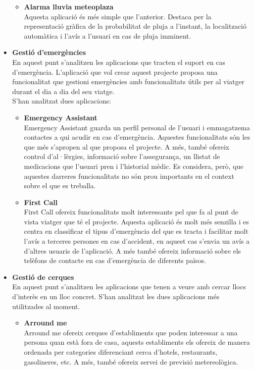 \begin{itemize}
\begin{itemize}
\item{\textbf{Alarma lluvia meteoplaza}}\\
Aquesta aplicació és més simple que l’anterior. Destaca per la representació gràfica de la probabilitat de pluja a l’instant, la localització automàtica i l’avís a l’usuari en cas de pluja imminent.
\end{itemize}
\item{\textbf{Gestió d’emergències}}\\
En aquest punt s’analitzen les aplicacions que tracten el suport en cas d’emergència. L’aplicació que vol crear aquest projecte proposa una funcionalitat que gestioni emergències amb funcionalitats útils per al viatger durant el dia a dia del seu viatge.\\
S’han analitzat dues aplicacions:
\begin{itemize}
\item{\textbf{Emergency Assistant}}\\
Emergency Assistant guarda un perfil personal de l’usuari i emmagatzema contactes a qui acudir en cas d’emergència. Aquestes funcionalitats són les que més s’apropen al que proposa el projecte. A més, també ofereix control d’al·lèrgies, informació sobre l’assegurança, un llistat de medicacions que l’usuari pren i l’historial mèdic. Es considera, però, que aquestes darreres funcionalitats no són prou importants en el context sobre el que es treballa.
\item{\textbf{First Call}}\\
First Call ofereix funcionalitats molt interessants pel que fa al punt de vista viatger que té el projecte. Aquesta aplicació és molt més senzilla i es centra en classificar el tipus d’emergència del que es tracta i facilitar molt l’avís a terceres persones en cas d’accident, en aquest cas s’envia un avís a d’altres usuaris de l’aplicació. A més també ofereix informació sobre els telèfons de contacte en cas d’emergència de diferents països.
\end{itemize}
\item{\textbf{Gestió de cerques}}\\
En aquest punt s’analitzen les aplicacions que tenen a veure amb cercar llocs d’interès en un lloc concret.
S’han analitzat les dues aplicacions més utilitzades al moment.
\begin{itemize}
\item{\textbf{Arround me}}\\
Arround me ofereix cerques d’establiments que poden interessar a una persona quan està fora de casa, aquests establiments els ofereix de manera ordenada per categories diferenciant cerca d’hotels, restaurants, gasolineres, etc. A més, també ofereix servei de previsió metereològica.

\end{itemize}
\end{itemize}

